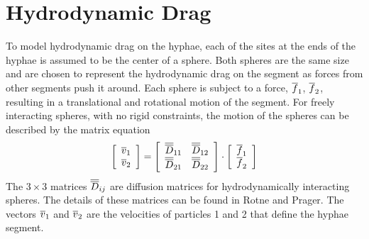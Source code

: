 \documentclass[12pt]{article}
\begin{document}
\section{Hydrodynamic Drag}
To model hydrodynamic drag on the hyphae, each of the sites at the ends of the
hyphae is assumed to be the center of a sphere. Both spheres are the same size
and are chosen to represent
the hydrodynamic drag on the segment as forces from other segments push
it around. Each sphere is subject to a force, $\overline{f}_1$, $\overline{f}_2$, resulting in
a translational and rotational motion of the segment. For freely interacting
spheres, with no rigid constraints, the motion of the spheres can be described
by the matrix equation
\[
\left[\begin{array}{c}\overline{v}_1 \\ \overline{v}_2 \end{array}\right] =
\left[\begin{array}{cc} \overline{\overline{D}}_{11} & \overline{\overline{D}}_{12} \\
\overline{\overline{D}}_{21} & \overline{\overline{D}}_{22} \end{array}\right]
\cdot\left[\begin{array}{c} \overline{f}_1 \\ \overline{f}_2 \end{array}\right]
\]
The $3\times 3$ matrices $\overline{\overline{D}}_{ij}$ are diffusion matrices for hydrodynamically
interacting spheres. The details of these matrices can be found in Rotne and
Prager\cite{RP}. The vectors $\overline{v}_1$ and $\overline{v}_2$ are the
velocities of particles 1 and 2 that define the hyphae segment.
\end{document}
